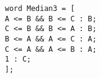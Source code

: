\documentclass{article}
\begin{document}
\texttt{word Median3 = [ \\
\hspace*{5mm} A <= B \&\& B <= C : B; \\
\hspace*{5mm} C <= B \&\& B <= A : B; \\
\hspace*{5mm} B <= A \&\& A <= C : A; \\
\hspace*{5mm} C <= A \&\& A <= B : A; \\
\hspace*{5mm} 1 : C; \\
];}
\end{document}
